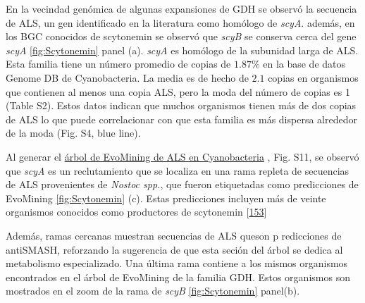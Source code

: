 \documentclass[12pt,twoside]{reedthesis}
\begin{document}
  En la vecindad genómica de algunas expansiones de GDH se observó la
  secuencia de ALS, un gen identificado en la literatura como homólogo de
  \emph{scyA}. además, en los BGC conocidos de scytonemin se observó que
  \emph{scyB} se conserva cerca del gene \emph{scyA}
  \autoref{fig:Scytonemin} panel (a). \emph{scyA} es homólogo de la
  subunidad larga de ALS. Esta familia tiene un número promedio de copias
  de \(1.87\%\) en la base de datos Genome DB de Cyanobacteria. La media
  es de hecho de \(2.1\) copias en organismos que contienen al menos una
  copia ALS, pero la moda del número de copias es 1 (Table S2). Estos
  datos indican que muchos organismos tienen más de dos copias de ALS lo
  que puede correlacionar con que esta familia es más dispersa alrededor
  de la moda (Fig. S4, blue line).
  
  Al generar el
  \href{https://microreact.org/project/B11HkUtdm?tt=cr.}{árbol de
  EvoMining de ALS en Cyanobacteria} , Fig. S11, se observó que
  \emph{scyA} es un reclutamiento que se localiza en una rama repleta de
  secuencias de ALS provenientes de \emph{Nostoc spp.}, que fueron
  etiquetadas como predicciones de EvoMining \autoref{fig:Scytonemin} (c).
  Estas predicciones incluyen más de veinte organismos conocidos como
  productores de scytonemin
  {[}\protect\hyperlink{ref-balskus_investigating_2008}{153}{]}
  
  Además, ramas cercanas muestran secuencias de ALS queson p redicciones
  de antiSMASH, reforzando la sugerencia de que esta seción del árbol se
  dedica al metabolismo especializado. Una última rama contiene a los
  mismos organismos encontrados en el árbol de EvoMining de la familia
  GDH. Estos organismos son mostrados en el zoom de la rama de \emph{scyB}
  \autoref{fig:Scytonemin} panel(b).
  
\end{document}
